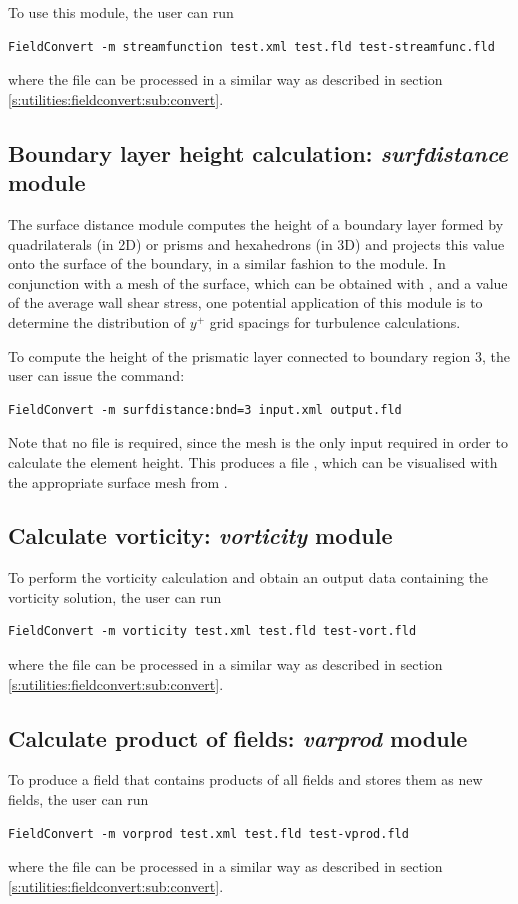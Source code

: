 To use this module, the user can run
\begin{lstlisting}[style=BashInputStyle]
FieldConvert -m streamfunction test.xml test.fld test-streamfunc.fld
\end{lstlisting}
where the file  can be processed in a similar
way as described in section \ref{s:utilities:fieldconvert:sub:convert}.

%
%
%
\subsection{Boundary layer height calculation: \textit{surfdistance} module}

The surface distance module computes the height of a boundary layer formed by
quadrilaterals (in 2D) or prisms and hexahedrons (in 3D)
and projects this value onto the surface of the boundary, in a similar fashion
to the  module. In conjunction with a mesh of the surface, which
can be obtained with , and a value of the average wall shear
stress, one potential application of this module is to determine the
distribution of $y^+$ grid spacings for turbulence calculations.

To compute the height of the prismatic layer connected to boundary region 3, the
user can issue the command:
\begin{lstlisting}[style=BashInputStyle]
FieldConvert -m surfdistance:bnd=3 input.xml output.fld
\end{lstlisting}
Note that no  file is required, since the mesh is the only input
required in order to calculate the element height. This produces a file
, which can be visualised with the appropriate surface
mesh from .

%
%
%
\subsection{Calculate vorticity: \textit{vorticity} module}
To perform the vorticity calculation and obtain an output
data containing the vorticity solution, the user can run
\begin{lstlisting}[style=BashInputStyle]
FieldConvert -m vorticity test.xml test.fld test-vort.fld
\end{lstlisting}
where the file  can be processed in a similar
way as described in section \ref{s:utilities:fieldconvert:sub:convert}.
%
%
%

%
%
%
\subsection{Calculate product of fields: \textit{varprod} module}
To produce a field that contains products of all fields
and stores them as new fields, the user can run
\begin{lstlisting}[style=BashInputStyle]
FieldConvert -m vorprod test.xml test.fld test-vprod.fld
\end{lstlisting}
where the file  can be processed in a similar
way as described in section \ref{s:utilities:fieldconvert:sub:convert}.
%
%
%


